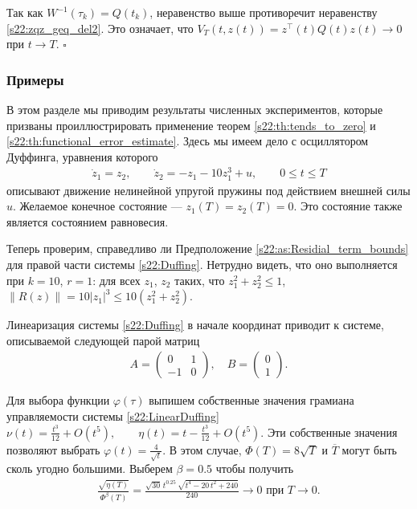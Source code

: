 \documentclass[../main.tex]{subfiles}
\begin{document}
 Так как $ W^{-1}(\tau_k) = Q(t_k)$, неравенство выше противоречит неравенству \eqref{s22:zqz_geq_del2}. 
 Это означает, что $V_{T}(t,z(t)) = z^{\top}(t)Q(t)z(t) \to 0$ при $t \to T$.
 \hfill $ \square $

\subsubsection{Примеры}
\label{s2:examples}

В этом разделе мы приводим результаты численных экспериментов, которые призваны проиллюстрировать применение теорем \ref{s22:th:tends_to_zero} и \ref{s22:th:functional_error_estimate}. 
Здесь мы имеем дело с осциллятором Дуффинга, уравнения которого
\begin{gather}\label{s22:Duffing}
 \dot{z}_1 = z_2, \qquad \dot{z}_2 = -z_1 - 10z_1^3 + u,\qquad 0\leqslant t 
 \leqslant T
\end{gather}
описывают движение нелинейной упругой пружины под действием внешней силы $u$. 
Желаемое конечное состояние --- $z_1(T) = z_2(T) = 0$. 
Это состояние также является состоянием равновесия. 

Теперь проверим, справедливо ли Предположение \ref{s22:as:Residial_term_bounds} для правой части системы \eqref{s22:Duffing}. 
Нетрудно видеть, что оно выполняется при $k = 10$, $r = 1$: для всех $z_1$, $z_2$ таких, что $z_1^2+z_2^2 \leqslant 1$, $\|R(z)\| = 10|z_1|^3 \leqslant 10 (z_1^2+z_2^2)$.

Линеаризация системы \eqref{s22:Duffing} в начале координат приводит к системе, описываемой следующей парой матриц
\begin{gather}\label{s22:LinearDuffing}
A = \begin{pmatrix} 0 & 1\\
 -1 & 0
 \end{pmatrix}, \quad B = \begin{pmatrix}
 0\\
 1
 \end{pmatrix}.
\end{gather}

Для выбора функции $\varphi(\tau)$ выпишем собственные значения грамиана управляемости системы \eqref{s22:LinearDuffing} $\nu(t) = \frac{t^3}{12} + O(t^5), \qquad \eta(t) = t - \frac{t^3}{12}+ O(t^5)$.
Эти собственные значения позволяют выбрать $\varphi(t) = \frac{4}{\sqrt{t}}$. 
В этом случае, $\Phi(T) = 8\sqrt{T}$ и $\overline{T}$ могут быть сколь угодно большими. 
Выберем $\beta = 0.5$ чтобы получить 
\begin{gather*}
 \frac{\sqrt{\eta(T)}}{\Phi^\beta(T)} = \frac{\sqrt{30}\,t^{0.25}\,\sqrt{t^4-20\,t^2+240}}{240} \to 0 \mbox{ при } T \to 0.
\end{gather*} 
\end{document}
